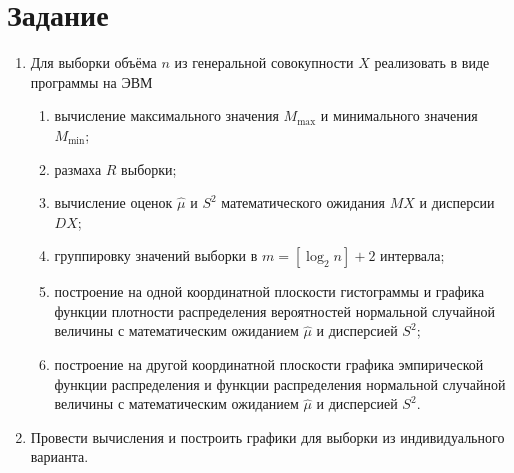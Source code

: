 \chapter{Задание}


\begin{enumerate}
\item Для выборки объёма $n$ из генеральной совокупности $X$ реализовать в виде программы на ЭВМ
\begin{enumerate}
            \item вычисление максимального значения $M_{\max}$ и минимального значения $M_{\min}$;
            \item размаха $R$ выборки;
            \item вычисление оценок $\hat\mu$ и $S^2$ математического ожидания $MX$ и дисперсии $DX$;
            \item группировку значений выборки в $m = [\log_2 n] + 2$ интервала;
            \item построение на одной координатной плоскости гистограммы и графика функции плотности распределения вероятностей нормальной случайной величины с математическим ожиданием $\hat{\mu}$ и дисперсией $S^2$;
            \item построение на другой координатной плоскости графика эмпирической функции распределения и функции распределения нормальной случайной величины с математическим ожиданием $\hat{\mu}$ и дисперсией $S^2$.
\end{enumerate}
\item Провести вычисления и построить графики для выборки из индивидуального варианта.
\end{enumerate}




